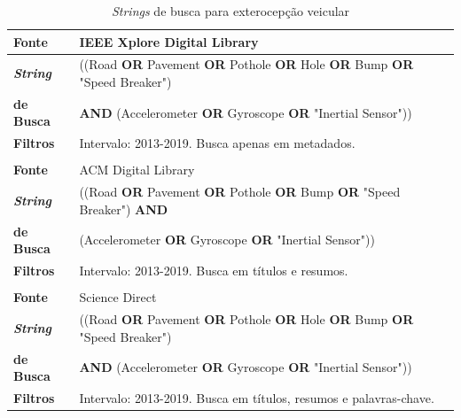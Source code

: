 \begin{table}[h!]
    \caption{\textit{Strings} de busca para exterocepção veicular}
    \label{tabela:percepcao_ambiente_busca}
    \centering
    \small
    \begin{tabular}{l l}
        
        \toprule
        \textbf{Fonte} & IEEE Xplore Digital Library \\
        \midrule
        \textbf{\textit{String}} & ((Road \textbf{OR} Pavement \textbf{OR} Pothole \textbf{OR} Hole \textbf{OR} Bump \textbf{OR} "Speed Breaker") \\ \textbf{de Busca} &  \textbf{AND} (Accelerometer \textbf{OR} Gyroscope \textbf{OR} "Inertial Sensor")) \\
        \midrule
        \textbf{Filtros} & Intervalo: 2013-2019. Busca apenas em metadados. \\
        \bottomrule
        
        \\
        
        \toprule
        \textbf{Fonte} & ACM Digital Library \\
        \midrule
        \textbf{\textit{String}} & ((Road \textbf{OR} Pavement \textbf{OR} Pothole \textbf{OR} Bump \textbf{OR} "Speed Breaker") \textbf{AND} \\ \textbf{de Busca} & (Accelerometer \textbf{OR} Gyroscope \textbf{OR} "Inertial Sensor")) \\ 
        \midrule
        \textbf{Filtros} & Intervalo: 2013-2019. Busca em títulos e resumos. \\ 
        \bottomrule
        
        \\
        
        \toprule
        \textbf{Fonte} & Science Direct \\
        \midrule
        \textbf{\textit{String}} & ((Road \textbf{OR} Pavement \textbf{OR} Pothole \textbf{OR} Hole \textbf{OR} Bump \textbf{OR} "Speed Breaker") \\ \textbf{de Busca} &  \textbf{AND} (Accelerometer \textbf{OR} Gyroscope \textbf{OR} "Inertial Sensor")) \\ 
        \midrule
        \textbf{Filtros} & Intervalo: 2013-2019. Busca em títulos, resumos e palavras-chave. \\
        \bottomrule
    \end{tabular}
\end{table}

